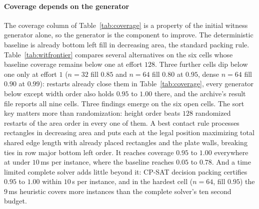 \documentclass[preprint,12pt,authoryear]{elsarticle}
\begin{document}
\paragraph{Coverage depends on the generator}
The coverage column of Table~\ref{tab:coverage} is a property of the initial
witness generator alone, so the generator is the component to improve.
The deterministic baseline is already bottom left fill in decreasing area, the
standard packing rule. Table~\ref{tab:witfrontier} compares several
alternatives on the six cells whose baseline coverage remains below one at
effort $128$. Three further cells dip below one only at effort $1$ ($n=32$
fill $0.85$ and $n=64$ fill $0.80$ at $0.95$, dense $n=64$ fill $0.90$ at
$0.99$): restarts already close them in Table~\ref{tab:coverage}, every
generator below except width order also holds $0.95$ to $1.00$ there, and the
archive's result file reports all nine cells. Three findings emerge on the six
open cells. The sort key matters more than randomization:
height order beats
$128$ randomized restarts of the area order in every one of them. A
best contact rule processes rectangles in decreasing area and puts each at the
legal position maximizing total shared edge length with already placed
rectangles and the plate walls, breaking ties in row major bottom left order. It reaches coverage
$0.95$ to $1.00$ everywhere at under $10$\,ms per instance, where the baseline
reaches $0.05$ to $0.78$. And a time limited complete solver adds little
beyond it: CP-SAT decision packing certifies $0.95$ to $1.00$ within $10$\,s
per instance, and in the hardest cell ($n=64$, fill $0.95$) the $9$\,ms
heuristic covers more instances than the complete solver's ten second budget.
\end{document}
